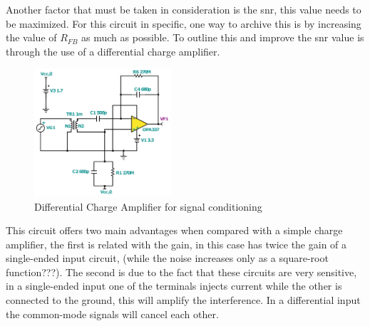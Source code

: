 Another factor that must be taken in consideration is the \acrshort{snr}, this value needs to be maximized. For this circuit in specific, one way to archive this is by increasing the value of $R_{FB}$ as much as possible. To outline this and improve the \acrshort{snr} value is through the use of a differential charge amplifier.
\begin{figure}[]
    \centering
    \includegraphics[width=0.45\textwidth]{Chapters/4CHP/Figures/differentialchargeamp.pdf}
    \caption{Differential Charge Amplifier for signal conditioning}
    \label{fig:ChargeAmpDif}
\end{figure}
This circuit offers two main advantages when compared with a simple charge amplifier, the first is related with the gain, in this case has twice the gain of a single-ended input circuit, (while the noise increases only as a square-root function???). The second is due to the fact that these circuits are very sensitive, in a single-ended input one of the terminals injects current while the other is connected to the ground, this will amplify the interference. In a differential input the common-mode signals will cancel each other.

